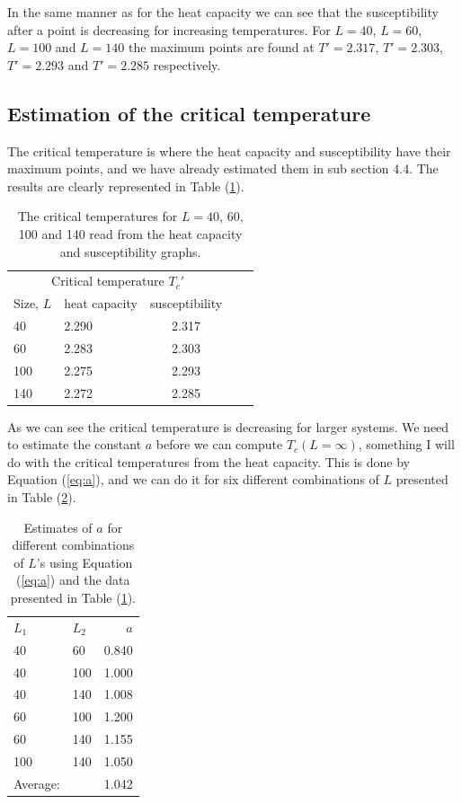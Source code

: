 \documentclass[norsk,a4paper,12pt]{article}
\begin{document}
In the same manner as for the heat capacity we can see that the susceptibility after a point is decreasing for increasing temperatures. For $L=40$, $L=60$, $L=100$ and $L=140$ the maximum points are found at $T'=2.317$, $T'=2.303$, $T'=2.293$ and $T'=2.285$ respectively. 

\subsection{Estimation of the critical temperature}
The critical temperature is where the heat capacity and susceptibility have their maximum points, and we have already estimated them in sub section 4.4. The results are clearly represented in Table (\ref{tab:tc}).
\begin{table}[h]
\centering
\caption{The critical temperatures for $L=40$, 60, 100 and 140 read from the heat capacity and susceptibility graphs.}
\label{tab:tc} 
\begin{tabularx}{\textwidth}{XlcrX}
&&\\
\toprule
\multicolumn{3}{c}{Critical temperature $T_c'$}\\
\cline{2-3}
Size, $L$  & heat capacity  & susceptibility\\
\midrule
40   & 2.290  & 2.317\\
60   & 2.283  & 2.303\\
100  & 2.275  & 2.293\\
140  & 2.272  & 2.285\\
\bottomrule
\end{tabularx}
\end{table}
As we can see the critical temperature is decreasing for larger systems. We need to estimate the constant $a$ before we can compute $T_c(L=\infty)$, something I will do with the critical temperatures from the heat capacity. This is done by Equation (\ref{eq:a}), and we can do it for six different combinations of $L$ presented in Table (\ref{tab:as}). 
\begin{table}[H]
\centering
\caption{Estimates of $a$ for different combinations of $L$'s using Equation (\ref{eq:a}) and the data presented in Table (\ref{tab:tc}).}
\label{tab:as} 
\begin{tabularx}{\textwidth}{XXr}
&&\\
\toprule
$L_1$ & $L_2$  & $a$\\
\midrule
40   & 60   & 0.840\\
40   & 100  & 1.000\\
40   & 140  & 1.008\\
60   & 100  & 1.200\\
60   & 140  & 1.155\\
100  & 140  & 1.050\\
\midrule
Average:&& 1.042\\
\bottomrule
\end{tabularx}
\end{table}
\end{document}
